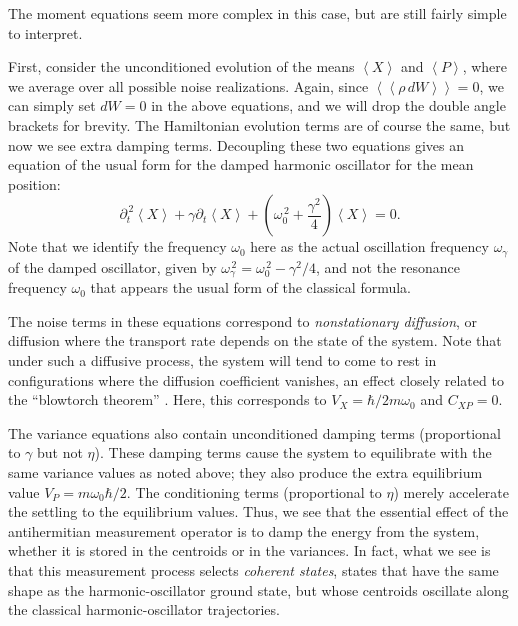 \documentclass[12pt,aps,onecolum,superscriptaddress,footinbib,floatfix,showpacs]{revtex4-1}
\newcommand{\dlangle}{\left\langle\!\left\langle}
\newcommand{\drangle}{\right\rangle\!\right\rangle}
\def\dexpct#1{\dlangle{#1}\drangle}
\def\expct#1{\!\left\langle{#1}\right\rangle}
\def\Vx{V_X}
\def\Vp{V_P}
\def\Cxp{C_{XP}}
\begin{document}
The moment equations seem more complex in this case, but are still
fairly simple to interpret.



First, consider the unconditioned evolution of the 
means $\expct{X}$ and $\expct{P}$, where we average over all possible
noise realizations.  
Again, since $\dexpct{\rho\, dW}=0$, we can simply set $dW=0$ in the above
equations, and we will drop the double angle brackets for brevity.
The Hamiltonian evolution terms
are of course the same, but now we see extra damping terms.
Decoupling these two equations %
gives an equation of the usual form for the damped harmonic oscillator for the 
mean position:
\begin{equation}
  \partial_t^{\,2}{\expct{X}} + \gamma\partial_t{\expct{X}} 
   + \left(\omega_0^{\,2}+\frac{\gamma^2}{4}\right)\expct{X} = 0.
\end{equation}
Note that we identify the frequency $\omega_0$ 
here as the actual oscillation frequency $\omega_\gamma$ of the damped oscillator,
given by $\omega_\gamma^{\,2} = \omega_0^{\,2} - \gamma^2/4$, and
not the resonance frequency $\omega_0$ that appears the usual form of the
classical formula.

The noise terms in these equations correspond to \textit{nonstationary
diffusion}, or diffusion where the transport rate depends on the
state of the system.  Note that under such a diffusive process,
the system will tend to come to rest in configurations where 
the diffusion coefficient vanishes, an effect closely related to
the ``blowtorch theorem'' \cite{Landauer93}. 
Here, this corresponds to $\Vx=\hbar/2m\omega_0$ and $\Cxp=0$.

The variance equations also contain unconditioned damping
terms (proportional to $\gamma$ but not $\eta$).
These damping terms cause the system to equilibrate with the same
variance values as noted above; they also produce the extra
equilibrium value
$\Vp=m\omega_0 \hbar/2$.
The conditioning terms (proportional to $\eta$) merely accelerate the
settling to the equilibrium values.
Thus, we see that the essential effect of the antihermitian 
measurement operator is to damp the energy from the system,
whether it is stored in the centroids or in the variances.
In fact, what we see is that this measurement process
selects \textit{coherent states}, states that have the same
shape as the harmonic-oscillator ground state, but whose centroids
oscillate along the classical harmonic-oscillator trajectories.
\end{document}

